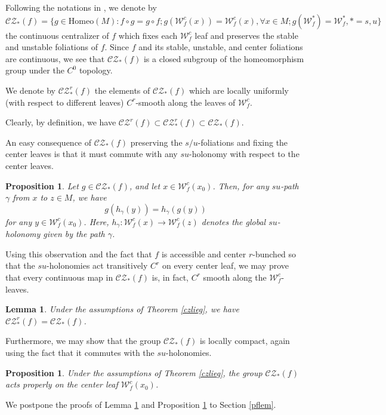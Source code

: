 \documentclass[11pt]{amsart}
\numberwithin{equation}{section}
\newcommand{\W}{\mathcal{W}}
\newcommand{\CZ}{\mathcal{CZ}}
\theoremstyle{plain}
\newtheorem{prop}[thm]{Proposition}
\newtheorem{lem}[thm]{Lemma}
\begin{document}
Following the notations in \cite{DWX23}, we denote by
$$\CZ_*(f)=\{g\in \mathrm{Homeo}(M): f\circ g=g\circ f; g(\W^c_f(x))=\W^c_f(x), \forall x\in M; g(\W^{*}_f)=\W^{*}_f, *=s,u\}$$
the continuous centralizer of $f$ which fixes each $\W^c_f$ leaf and preserves the stable and unstable foliations of $f$. Since $f$ and its stable, unstable, and center foliations are continuous, we see that $\CZ_*(f)$ is a closed subgroup of the homeomorphism group under the $C^0$ topology.

We denote by $\CZ^r_*(f)$ the elements of $\CZ_*(f)$ which are locally uniformly (with respect to different leaves) $C^r$-smooth along the leaves of $\W^c_f$.

Clearly, by definition, we have $\CZ^r(f)\subset \CZ^r_*(f)\subset \CZ_*(f)$.

An easy consequence of $\CZ_*(f)$ preserving the $s/u$-foliations and fixing the center leaves is that it must commute with any $su$-holonomy with respect to the center leaves.

\begin{prop}\label{comhol}
Let $g\in \CZ_*(f)$, {and let $x\in \W^c_f(x_0)$. Then, for any $su$-path $\gamma$ from $x$ to $z\in M$, we have
$$g(h_\gamma(y))=h_\gamma(g(y))$$
for any $y\in \W^c_f(x_0)$. Here, $h_\gamma:\W^c_f(x)\to \W^c_f(z)$ denotes the global $su$-holonomy given by the path $\gamma$.}
\end{prop}

Using this observation and the fact that $f$ is accessible and center $r$-bunched so that the $su$-holonomies act transitively $C^r$ on every center leaf, we may prove that every continuous map in $\CZ_*(f)$ is, in fact, $C^r$ smooth along the $\W^c_f$-leaves. 

\begin{lem}\label{CrWc}
Under the assumptions of Theorem \ref{czlieg}, we have $\CZ^r_*(f)=\CZ_*(f)$. 
\end{lem}

Furthermore, we may show that the group $\CZ_*(f)$ is locally compact, again using the fact that it commutes with the $su$-holonomies.

\begin{prop}\label{CZcpt}
Under the assumptions of Theorem \ref{czlieg}, the group $\CZ_*(f)$ {acts properly on the center leaf $\W^c_f(x_0)$.}
\end{prop}

We postpone the proofs of Lemma \ref{CrWc} and Proposition \ref{CZcpt} to Section \ref{pflem}.
\end{document}
